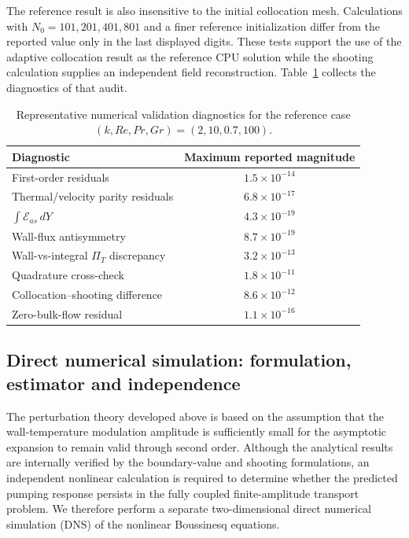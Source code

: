 \documentclass[12pt,a4paper]{article}
\newcommand{\Rey}{\mathit{Re}}
\newcommand{\Grr}{\mathit{Gr}}
\renewcommand{\Pr}{\mathit{Pr}}
\newcommand{\PiT}{\Pi_T}
\newenvironment{ruledtabular}{}{}
\begin{document}
The reference result is also insensitive to the initial collocation mesh. Calculations with $N_0=101,201,401,801$
and a finer reference initialization differ from the reported value only in the last displayed digits.
These tests support the use of the adaptive collocation result as the reference CPU solution while the
shooting calculation supplies an independent field reconstruction.
Table~\ref{tab:validation_summary} collects the diagnostics of that audit.

\begin{table}[htb]
  \centering
  \caption{Representative numerical validation diagnostics for the reference case
  $(k,\Rey,\Pr,\Grr)=(2,10,0.7,100)$.}
  \label{tab:validation_summary}
  \begin{ruledtabular}
  \begin{tabular}{lc}
  Diagnostic & Maximum reported magnitude \\
  \hline
  First-order residuals & $1.5\times10^{-14}$ \\
  Thermal/velocity parity residuals & $6.8\times10^{-17}$ \\
  $\int\mathcal E_{as}\,dY$ & $4.3\times10^{-19}$ \\
  Wall-flux antisymmetry & $8.7\times10^{-19}$ \\
  Wall-vs-integral $\PiT$ discrepancy & $3.2\times10^{-13}$ \\
  Quadrature cross-check & $1.8\times10^{-11}$ \\
  Collocation--shooting difference & $8.6\times10^{-12}$ \\
  Zero-bulk-flow residual & $1.1\times10^{-16}$ \\
  \end{tabular}
  \end{ruledtabular}
\end{table}

\subsection{Direct numerical simulation: formulation, estimator and independence}
\label{sec:dns_validation}

The perturbation theory developed above is based on the assumption that the
wall-temperature modulation amplitude is sufficiently small for the asymptotic
expansion to remain valid through second order. Although the analytical results
are internally verified by the boundary-value and shooting formulations, an
independent nonlinear calculation is required to determine whether the
predicted pumping response persists in the fully coupled finite-amplitude
transport problem. We therefore perform a separate two-dimensional direct
numerical simulation (DNS) of the nonlinear Boussinesq equations.
\end{document}
